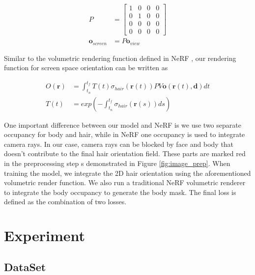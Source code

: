 \documentclass[12pt]{article}
\begin{document}
\begin{align}
P &= \begin{bmatrix}
1 & 0 & 0 & 0 \\
0 & 1 & 0 & 0 \\
0 & 0 & 0 & 0 \\
0 & 0 & 0 & 0
\end{bmatrix} \\
\mathbf{o}_{screen} &= P\mathbf{o}_{view}
\end{align}

Similar to the volumetric rendering function defined in NeRF \cite{mildenhall_nerf_2020}, our rendering function for screen space orientation can be written as

\begin{align}
O(\mathbf{r}) &= \int_{t_{n}}^{t_{f}} T(t) \sigma_{hair}(\mathbf{r}(t)) P V \mathbf{o}(\mathbf{r}(t), \mathbf{d}) dt \\
T(t) &= exp(-\int_{t_{n}}^{t_{f}} \sigma_{hair}(\mathbf{r}(s)) ds)
\end{align}

One important difference between our model and NeRF is we use two separate occupancy for body and hair, while in NeRF one occupancy is used to integrate camera rays. In our case, camera rays can be blocked by face and body that doesn't contribute to the final hair orientation field. These parts are marked red in the preprocessing step s demonstrated in Figure \ref{fig:image_prep}. When training the model, we integrate the 2D hair orientation using the aforementioned volumetric render function. We also run a traditional NeRF volumetric renderer to integrate the body occupancy to generate the body mask. The final loss is defined as the combination of two losses.

\section{Experiment}

\subsection{DataSet}
\end{document}
